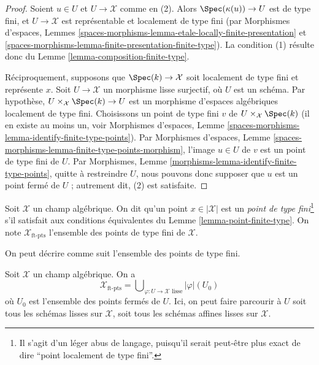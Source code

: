 \begin{proof}
Soient $u \in U$ et $U \to \mathcal{X}$ comme en (2). Alors
$\Spec(\kappa(u)) \to U$ est de type fini, et $U \to \mathcal{X}$ est
représentable et localement de type fini (par Morphismes d'espaces,
Lemmes \ref{spaces-morphisms-lemma-etale-locally-finite-presentation} et
\ref{spaces-morphisms-lemma-finite-presentation-finite-type}).
La condition (1) résulte donc du
Lemme \ref{lemma-composition-finite-type}.

\medskip\noindent
Réciproquement, supposons que $\Spec(k) \to \mathcal{X}$ soit localement de
type fini et représente $x$. Soit $U \to \mathcal{X}$ un morphisme lisse
surjectif, où $U$ est un schéma. Par hypothèse,
$U \times_\mathcal{X} \Spec(k) \to U$ est un morphisme d'espaces algébriques
localement de type fini. Choisissons un point de type fini $v$ de
$U \times_\mathcal{X} \Spec(k)$ (il en existe au moins un, voir Morphismes
d'espaces, Lemme \ref{spaces-morphisms-lemma-identify-finite-type-points}).
Par Morphismes d'espaces,
Lemme \ref{spaces-morphisms-lemma-finite-type-points-morphism},
l'image $u \in U$ de $v$ est un point de type fini de $U$.
Par Morphismes, Lemme \ref{morphisms-lemma-identify-finite-type-points},
quitte à restreindre $U$, nous pouvons donc supposer que $u$ est un point
fermé de $U$ ; autrement dit, (2) est satisfaite.
\end{proof}

\begin{definition}
\label{definition-finite-type-point}
Soit $\mathcal{X}$ un champ algébrique. On dit qu'un point
$x \in |\mathcal{X}|$ est un {\it point de type fini}\footnote{Il s'agit
d'un léger abus de langage, puisqu'il serait peut-être plus exact de dire
``point localement de type fini''.} s'il satisfait aux conditions équivalentes
du Lemme \ref{lemma-point-finite-type}. On note
$\mathcal{X}_{\text{ft-pts}}$ l'ensemble des points de type fini de
$\mathcal{X}$.
\end{definition}

\noindent
On peut décrire comme suit l'ensemble des points de type fini.

\begin{lemma}
\label{lemma-identify-finite-type-points}
Soit $\mathcal{X}$ un champ algébrique. On a
$$
\mathcal{X}_{\text{ft-pts}} =
\bigcup\nolimits_{\varphi : U \to \mathcal{X}\text{ lisse}} |\varphi|(U_0)
$$
où $U_0$ est l'ensemble des points fermés de $U$.
Ici, on peut faire parcourir à $U$ soit tous les schémas lisses sur
$\mathcal{X}$, soit tous les schémas affines lisses sur $\mathcal{X}$.
\end{lemma}

